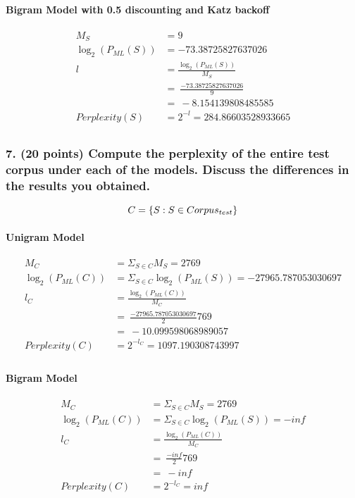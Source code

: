 \documentclass{article}
\begin{document}
\paragraph{Bigram Model with 0.5 discounting and Katz backoff}
\begin{equation}
\begin{split}
M_{S} &= 9 \\
\log_{2} (P_{ML}(S)) &= -73.38725827637026 \\
l &= \frac{\log_{2} (P_{ML}(S))}{M_{S}} \\ &=\ \frac{-73.38725827637026}9 \\ &=\ -8.154139808485585 \\
Perplexity(S) &= 2^{-l} = 284.86603528933665\\
\end{split}
\end{equation}

\subsubsection*{7. (20 points) Compute the perplexity of the entire test corpus under each of the models. Discuss the differences in the results you obtained.}

\begin{equation}
    C = \{S: S \in Corpus_{test} \}\\
\end{equation}

\paragraph{Unigram Model}
\begin{equation}
\begin{split}
M_{C} &= \Sigma_{S \in C} M_{S} = 2769 \\
\log_{2} (P_{ML}(C)) &= \Sigma_{S \in C} \log_{2} (P_{ML}(S)) = -27965.787053030697 \\
l_{C} &= \frac{\log_{2}(P_{ML}(C))}{M_{C}} \\ &=\  \frac{-27965.787053030697}2769 \\ &=\   -10.099598068989057 \\
Perplexity(C) &= 2^{-l_{C}} = 1097.190308743997\\
\end{split}
\end{equation}
\paragraph{Bigram Model}
\begin{equation}
\begin{split}
M_{C} &= \Sigma_{S \in C} M_{S} = 2769 \\
\log_{2} (P_{ML}(C)) &= \Sigma_{S \in C} \log_{2} (P_{ML}(S)) = -inf \\
l_{C} &= \frac{\log_{2}(P_{ML}(C))}{M_{C}} \\ &=\  \frac{-inf}2769 \\ &=\   -inf \\
Perplexity(C) &= 2^{-l_{C}} = inf\\
\end{split}
\end{equation}
\end{document}
